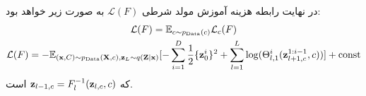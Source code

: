 در نهایت رابطه هزینه آموزش مولد شرطی $\mathcal{L} (F)$ به صورت زیر خواهد بود:
\begin{gather}
    \mathcal{L} (F) = \mathbb E_{c \sim p_\text{Data}(c)} \mathcal{L}_c (F) \nonumber 
    \\
    \mathcal{L} (F) = - \mathbb E_{({\bf x},C) \sim p_\text{Data}({\bf X},c), {\bf z}_L \sim q({\bf Z}|{\bf x})} [-\sum_{i=1}^D \frac{1}{2} \{{\bf z}^i_0\}^2 + \sum_{l=1}^L \log (\Theta^{i}_{l,1}({\bf z}^{1:i-1}_{l+1, c}, c))] + \text{const}
\end{gather}
که 
${\bf z}_{l-1,c} = F^{-1}_{l}({\bf z}_{l,c},c)$ است.